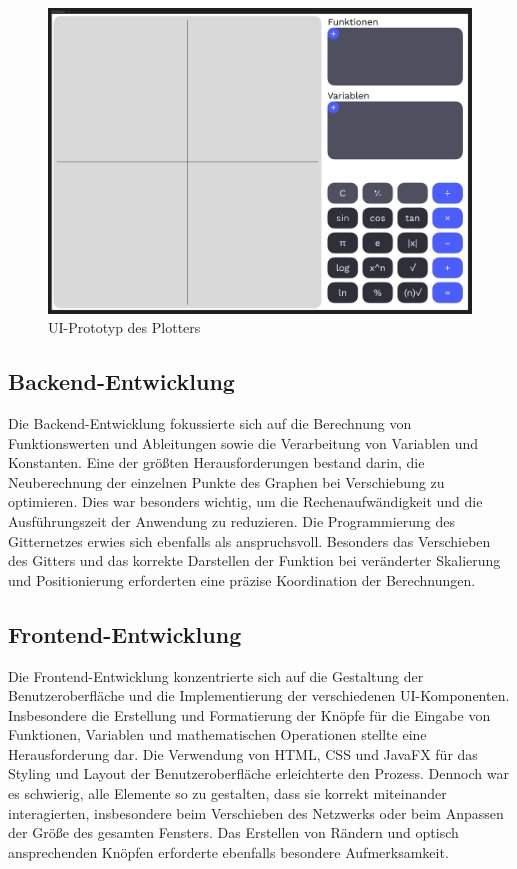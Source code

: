 \documentclass[a4paper]{article}
\begin{document}
\begin{figure}[ht]
	\centering
	\includegraphics[width=\textwidth]{Resources/ui_prototype.png}
	\caption{UI-Prototyp des Plotters}
	\label{fig:ui_prototype}
\end{figure}

\subsection{Backend-Entwicklung}
Die Backend-Entwicklung fokussierte sich auf die Berechnung von Funktionswerten und Ableitungen sowie die Verarbeitung von Variablen und Konstanten. Eine der größten Herausforderungen bestand darin, die Neuberechnung der einzelnen Punkte des Graphen bei Verschiebung zu optimieren. Dies war besonders wichtig, um die Rechenaufwändigkeit und die Ausführungszeit der Anwendung zu reduzieren. Die Programmierung des Gitternetzes erwies sich ebenfalls als anspruchsvoll. Besonders das Verschieben des Gitters und das korrekte Darstellen der Funktion bei veränderter Skalierung und Positionierung erforderten eine präzise Koordination der Berechnungen.

\subsection{Frontend-Entwicklung}
Die Frontend-Entwicklung konzentrierte sich auf die Gestaltung der Benutzeroberfläche und die Implementierung der verschiedenen UI-Komponenten. Insbesondere die Erstellung und Formatierung der Knöpfe für die Eingabe von Funktionen, Variablen und mathematischen Operationen stellte eine Herausforderung dar. Die Verwendung von HTML, CSS und JavaFX für das Styling und Layout der Benutzeroberfläche erleichterte den Prozess. Dennoch war es schwierig, alle Elemente so zu gestalten, dass sie korrekt miteinander interagierten, insbesondere beim Verschieben des Netzwerks oder beim Anpassen der Größe des gesamten Fensters. Das Erstellen von Rändern und optisch ansprechenden Knöpfen erforderte ebenfalls besondere Aufmerksamkeit.
\end{document}
